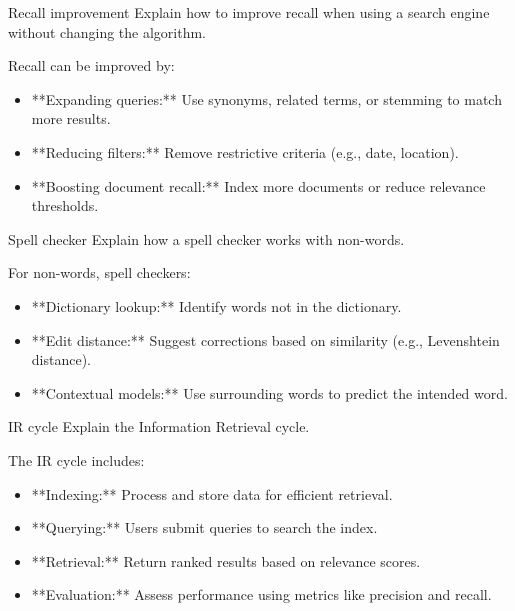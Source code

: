 \documentclass{article}
\begin{document}
\begin{exercise}{Recall improvement}
  Explain how to improve recall when using a search engine without changing the algorithm.

  \begin{solution}
    Recall can be improved by:
    \begin{itemize}
        \item **Expanding queries:** Use synonyms, related terms, or stemming to match more results.
        \item **Reducing filters:** Remove restrictive criteria (e.g., date, location).
        \item **Boosting document recall:** Index more documents or reduce relevance thresholds.
    \end{itemize}
  \end{solution}
\end{exercise}

\begin{exercise}{Spell checker}
  Explain how a spell checker works with non-words.

  \begin{solution}
    For non-words, spell checkers:
    \begin{itemize}
        \item **Dictionary lookup:** Identify words not in the dictionary.
        \item **Edit distance:** Suggest corrections based on similarity (e.g., Levenshtein distance).
        \item **Contextual models:** Use surrounding words to predict the intended word.
    \end{itemize}
  \end{solution}
\end{exercise}

\begin{exercise}{IR cycle}
  Explain the Information Retrieval cycle.

  \begin{solution}
    The IR cycle includes:
    \begin{itemize}
        \item **Indexing:** Process and store data for efficient retrieval.
        \item **Querying:** Users submit queries to search the index.
        \item **Retrieval:** Return ranked results based on relevance scores.
        \item **Evaluation:** Assess performance using metrics like precision and recall.
    \end{itemize}
  \end{solution}
\end{exercise}
\end{document}
